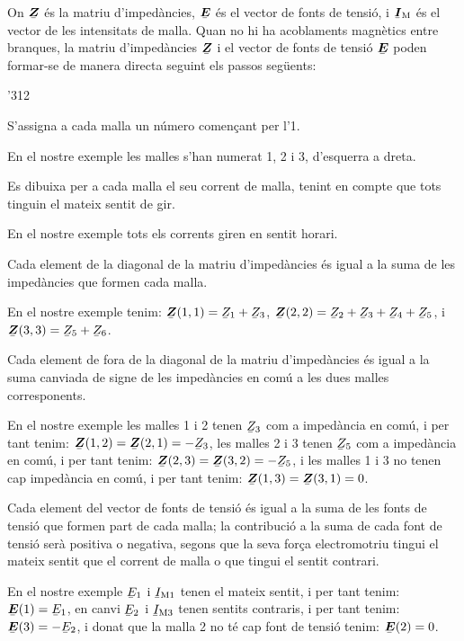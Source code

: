 On  $\mcmplx{Z}$ és la matriu d'impedàncies, $\mcmplx{E}$ és el vector de fonts de tensió, i $\mcmplx{I}\ped{M}$ és el vector de les intensitats de malla. Quan no hi ha acoblaments magnètics entre branques, la matriu d'impedàncies $\mcmplx{Z}$ i el vector de fonts de tensió $\mcmplx{E}$ poden formar-se de manera directa seguint els passos següents:
\begin{dingautolist}{'312}
   \item S'assigna a cada malla un número començant per l'1.

          En el nostre exemple les malles s'han numerat 1, 2 i 3, d'esquerra a dreta.
   \item Es dibuixa per a  cada malla el seu corrent de malla, tenint en compte que tots tinguin el mateix sentit de gir.

       En el nostre exemple tots els corrents giren en sentit horari.
   \item Cada element de la diagonal de la matriu d'impedàncies és igual a la suma de les impedàncies que formen cada malla.

       En el nostre exemple tenim: $\mcmplx{Z}(1,1)=\cmplx{Z}_1 + \cmplx{Z}_3$, $\mcmplx{Z}(2,2)=\cmplx{Z}_2 + \cmplx{Z}_3+ \cmplx{Z}_4+ \cmplx{Z}_5$, i $\mcmplx{Z}(3,3)=\cmplx{Z}_5 + \cmplx{Z}_6$.
   \item Cada element de fora de la diagonal de la matriu d'impedàncies és igual a la suma canviada de signe de les impedàncies en comú a les dues malles corresponents.

        En el nostre exemple les malles 1 i 2 tenen $\cmplx{Z}_3$ com a impedància en comú, i per tant tenim: $\mcmplx{Z}(1,2)=\mcmplx{Z}(2,1)= -\cmplx{Z}_3$, les malles 2 i 3 tenen $\cmplx{Z}_5$ com a impedància en comú, i per tant  tenim: $\mcmplx{Z}(2,3)=\mcmplx{Z}(3,2)= -\cmplx{Z}_5$, i les malles 1 i 3 no tenen cap impedància en comú, i per tant  tenim: $\mcmplx{Z}(1,3)=\mcmplx{Z}(3,1)= 0$.
    \item Cada element del vector de fonts de tensió és igual a la suma de les fonts de tensió que formen part de cada malla; la contribució a la suma de cada font de tensió serà positiva o negativa, segons que la seva força electromotriu tingui el mateix sentit que el corrent de malla o que  tingui el sentit contrari.

         En el nostre exemple $\cmplx{E}_1$ i $\cmplx{I}\ped{M1}$ tenen el mateix sentit, i per tant tenim:   $\mcmplx{E}(1) = \cmplx{E}_1$, en canvi $\cmplx{E}_2$ i $\cmplx{I}\ped{M3}$ tenen   sentits contraris, i per tant   tenim:   $\mcmplx{E}(3) = -\cmplx{E}_2$, i donat que la malla 2 no té cap font de tensió  tenim:   $\mcmplx{E}(2) = 0$.
\end{dingautolist}


